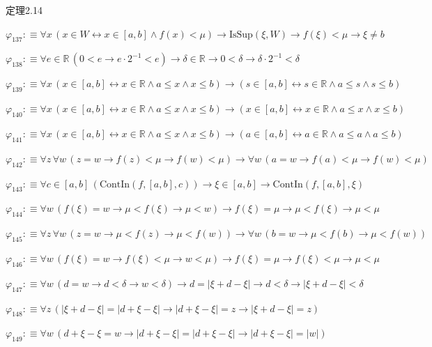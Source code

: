 \begin{fullproof}{定理2.14}
\begin{abbrevlist}
\item $\varphi_{137} :\equiv \forall x\,(x \in W \leftrightarrow x \in [a,b] \land f(x) < \mu) \to \mathrm{IsSup}(\xi,W) \to f(\xi) < \mu \to \xi \neq b$
\item $\varphi_{138} :\equiv \forall e \in \mathbb{R}\,(0 < e \to e \cdot 2^{-1} < e) \to \delta \in \mathbb{R} \to 0 < \delta \to \delta \cdot 2^{-1} < \delta$
\item $\varphi_{139} :\equiv \forall x\,(x \in [a,b] \leftrightarrow x \in \mathbb{R} \land a \leq x \land x \leq b) \to (s \in [a,b] \leftrightarrow s \in \mathbb{R} \land a \leq s \land s \leq b)$
\item $\varphi_{140} :\equiv \forall x\,(x \in [a,b] \leftrightarrow x \in \mathbb{R} \land a \leq x \land x \leq b) \to (x \in [a,b] \leftrightarrow x \in \mathbb{R} \land a \leq x \land x \leq b)$
\item $\varphi_{141} :\equiv \forall x\,(x \in [a,b] \leftrightarrow x \in \mathbb{R} \land a \leq x \land x \leq b) \to (a \in [a,b] \leftrightarrow a \in \mathbb{R} \land a \leq a \land a \leq b)$
\item $\varphi_{142} :\equiv \forall z\,\forall w\,(z = w \to f(z) < \mu \to f(w) < \mu) \to \forall w\,(a = w \to f(a) < \mu \to f(w) < \mu)$
\item $\varphi_{143} :\equiv \forall c \in [a,b]\,(\mathrm{ContIn}(f,[a,b],c)) \to \xi \in [a,b] \to \mathrm{ContIn}(f,[a,b],\xi)$
\item $\varphi_{144} :\equiv \forall w\,(f(\xi) = w \to \mu < f(\xi) \to \mu < w) \to f(\xi) = \mu \to \mu < f(\xi) \to \mu < \mu$
\item $\varphi_{145} :\equiv \forall z\,\forall w\,(z = w \to \mu < f(z) \to \mu < f(w)) \to \forall w\,(b = w \to \mu < f(b) \to \mu < f(w))$
\item $\varphi_{146} :\equiv \forall w\,(f(\xi) = w \to f(\xi) < \mu \to w < \mu) \to f(\xi) = \mu \to f(\xi) < \mu \to \mu < \mu$
\item $\varphi_{147} :\equiv \forall w\,(d = w \to d < \delta \to w < \delta) \to d = \lvert \xi + d - \xi \rvert \to d < \delta \to \lvert \xi + d - \xi \rvert < \delta$
\item $\varphi_{148} :\equiv \forall z\,(\lvert \xi + d - \xi \rvert = \lvert d + \xi - \xi \rvert \to \lvert d + \xi - \xi \rvert = z \to \lvert \xi + d - \xi \rvert = z)$
\item $\varphi_{149} :\equiv \forall w\,(d + \xi - \xi = w \to \lvert d + \xi - \xi \rvert = \lvert d + \xi - \xi \rvert \to \lvert d + \xi - \xi \rvert = \lvert w \rvert)$

\end{abbrevlist}
\end{fullproof}

